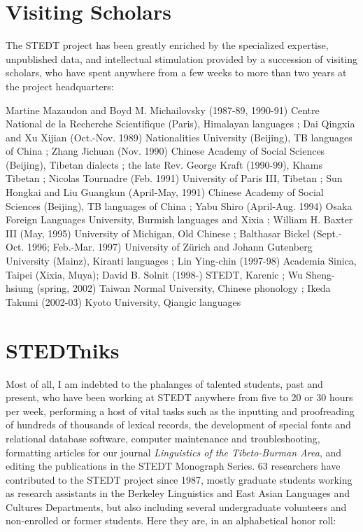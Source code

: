 \section{Visiting Scholars}

The STEDT project has been greatly enriched by the specialized expertise, unpublished data, and intellectual stimulation provided by a succession of visiting scholars, who have spent anywhere from a few weeks to more than two years at the project headquarters: 

Martine Mazaudon and Boyd M. Michailovsky (1987-89, 1990-91) Centre National de la Recherche Scientifique (Paris), Himalayan languages ; {\sc Dai} Qingxia and {\sc Xu} Xijian (Oct.-Nov. 1989) Nationalities University (Beijing), TB languages of China ; {\sc Zhang} Jichuan (Nov. 1990) Chinese Academy of Social Sciences (Beijing), Tibetan dialects ; the late Rev. George Kraft (1990-99), Khams Tibetan ; Nicolas Tournadre (Feb. 1991) University of Paris III, Tibetan ; {\sc Sun} Hongkai and {\sc Liu} Guangkun (April-May, 1991) Chinese Academy of Social Sciences (Beijing), TB languages of China ; {\sc Yabu} Shiro (April-Aug. 1994) Osaka Foreign Languages University, Burmish languages and Xixia ; William H. Baxter III (May, 1995) University of Michigan, Old Chinese ; Balthasar Bickel (Sept.-Oct. 1996; Feb.-Mar. 1997) University of Z\"urich and Johann Gutenberg University (Mainz), Kiranti languages ; {\sc Lin} Ying-chin (1997-98) Academia Sinica, Taipei (Xixia, Muya); David B. Solnit (1998-) STEDT, Karenic ; {\sc Wu} Sheng-hsiung (spring, 2002) Taiwan Normal University, Chinese phonology ; {\sc Ikeda} Takumi (2002-03) Kyoto University, Qiangic languages 

\section{STEDTniks}

Most of all, I am indebted to the phalanges of talented students, past and present, who have been working at STEDT anywhere from five to 20 or 30 hours per week, performing a host of vital tasks such as the inputting and proofreading of hundreds of thousands of lexical records, the development of special fonts and relational database software, computer maintenance and troubleshooting, formatting articles for our journal {\it Linguistics of the Tibeto-Burman Area}, and editing the publications in the STEDT Monograph Series. 63 researchers have contributed to the STEDT project since 1987, mostly graduate students working as research assistants in the Berkeley Linguistics and East Asian Languages and Cultures Departments, but also including several undergraduate volunteers and non-enrolled or former students. Here they are, in an alphabetical honor roll:

